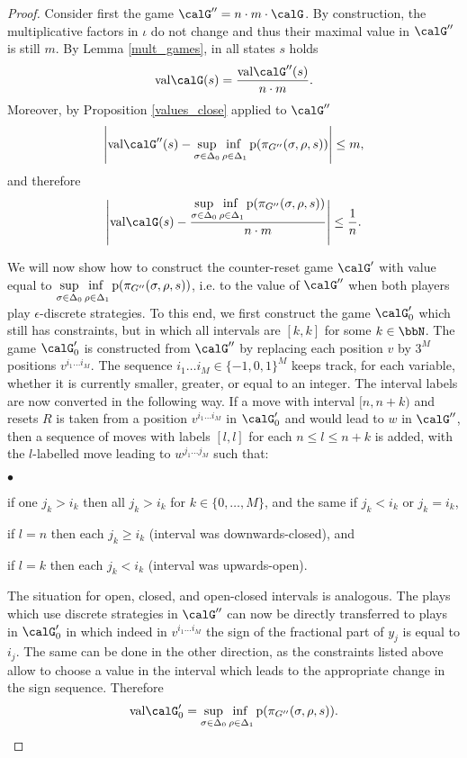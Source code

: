 \documentclass[fleqn,envcountsame]{LMCS}
\newcommand{\val}{\ensuremath{\mathrm{val}}}
\begin{document}
\begin{proof}
Consider first the game $\calG'' = n \cdot m \cdot \calG$.
By construction, the multiplicative factors in $\iota$ do not
change and thus their maximal value in $\calG''$ is still $m$.
By Lemma \ref{mult_games}, in all states $s$ holds
\[ \val\calG(s) = \frac{ \val\calG''(s) }{n \cdot m}. \]
Moreover, by Proposition \ref{values_close} applied to $\calG''$
\[ \left| \val\calG''(s) - \adjustlimits \sup_{\sigma \in \Delta_0}
     \inf_{\rho \in \Delta_1} \pay(\pi_{G''}(\sigma, \rho,s)) \right| \leq m, \]
and therefore
\[ \left| \val\calG(s) - \frac{\adjustlimits \sup_{\sigma \in \Delta_0}
     \inf_{\rho \in \Delta_1} \pay(\pi_{G''}(\sigma, \rho,s))}{n \cdot m} \right|
   \leq \frac 1 n. \]

We will now show how to construct the counter-reset game $\calG'$ with value equal to
$\adjustlimits \sup_{\sigma \in \Delta_0} \inf_{\rho \in \Delta_1} \pay(\pi_{G''}(\sigma, \rho,s))$,
i.e. to the value of $\calG''$ when both players play $\epsilon$-discrete strategies.
To this end, we first construct the game $\calG'_0$ which still has constraints, but
in which all intervals are $[k,k]$ for some $k \in \bbN$. The game $\calG'_0$ is
constructed from $\calG''$ by replacing each position $v$ by $3^M$ positions $v^{i_1 \ldots i_M}$.
The sequence $i_1 \ldots i_M \in \{-1, 0, 1\}^M$ keeps track, for each variable, whether
it is currently smaller, greater, or equal to an integer. The interval labels are now
converted in the following way. If a move with interval $[n, n+k)$ and resets $R$ is taken
from a position $v^{i_1 \ldots i_M}$ in $\calG'_0$ and would lead to $w$ in $\calG''$, then
a sequence of moves with labels $[l, l]$ for each $n \leq l \leq n+k$ is added,
with the $l$-labelled move leading to $w^{j_1 \ldots j_M}$ such that:
\begin{iteMize}{$\bullet$}
\item if one $j_k > i_k$ then all $j_k > i_k$ for $k \in \{0,\ldots,M\}$, and the same if $j_k<i_k$ or $j_k=i_k$,
\item if $l = n$ then each $j_k \geq i_k$ (interval was downwards-closed), and
\item if $l = k$ then each $j_k < i_k$ (interval was upwards-open). 
\end{iteMize}
The situation for open, closed, and open-closed intervals is analogous.
The plays which use discrete strategies in $\calG''$ can now be directly
transferred to plays in $\calG'_0$ in which indeed in $v^{i_1\ldots i_M}$
the sign of the fractional part of $y_j$ is equal to $i_j$. The same
can be done in the other direction, as the constraints listed above
allow to choose a value in the interval which leads to the appropriate
change in the sign sequence. Therefore 
\[ \val\calG'_0 = \adjustlimits \sup_{\sigma \in \Delta_0} \inf_{\rho \in \Delta_1} \pay(\pi_{G''}(\sigma, \rho,s)). \]


\end{proof}
\end{document}

